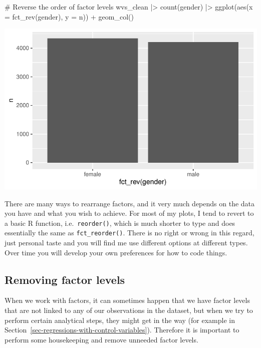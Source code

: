 \documentclass[
  letterpaper,
]{krantz}
\makeatletter
\newenvironment{Shaded}{\begin{snugshade}}{\end{snugshade}}
\newcommand{\AttributeTok}[1]{\textcolor[rgb]{0.40,0.45,0.13}{#1}}
\newcommand{\CommentTok}[1]{\textcolor[rgb]{0.37,0.37,0.37}{#1}}
\newcommand{\FunctionTok}[1]{\textcolor[rgb]{0.28,0.35,0.67}{#1}}
\newcommand{\NormalTok}[1]{\textcolor[rgb]{0.00,0.23,0.31}{#1}}
\newcommand{\SpecialCharTok}[1]{\textcolor[rgb]{0.37,0.37,0.37}{#1}}
\newenvironment{kframe}{%
\medskip{}
\setlength{\fboxsep}{.8em}
 \def\at@end@of@kframe{}%
 \ifinner\ifhmode%
  \def\at@end@of@kframe{\end{minipage}}%
  \begin{minipage}{\columnwidth}%
 \fi\fi%
 \def\FrameCommand##1{\hskip\@totalleftmargin \hskip-\fboxsep
 \colorbox{shadecolor}{##1}\hskip-\fboxsep
     \hskip-\linewidth \hskip-\@totalleftmargin \hskip\columnwidth}%
 \MakeFramed {\advance\hsize-\width
   \@totalleftmargin\z@ \linewidth\hsize
   \@setminipage}}%
 {\par\unskip\endMakeFramed%
 \at@end@of@kframe}
\renewenvironment{Shaded}{\begin{kframe}}{\end{kframe}}
\makeatother
\begin{document}
\begin{Shaded}
\begin{Highlighting}[]
\CommentTok{\# Reverse the order of factor levels}
\NormalTok{wvs\_clean }\SpecialCharTok{|\textgreater{}}
  \FunctionTok{count}\NormalTok{(gender) }\SpecialCharTok{|\textgreater{}}
  \FunctionTok{ggplot}\NormalTok{(}\FunctionTok{aes}\NormalTok{(}\AttributeTok{x =} \FunctionTok{fct\_rev}\NormalTok{(gender),}
             \AttributeTok{y =}\NormalTok{ n)) }\SpecialCharTok{+}
  \FunctionTok{geom\_col}\NormalTok{()}
\end{Highlighting}
\end{Shaded}

\includegraphics{07_data_wrangling_files/figure-pdf/reverse-order-1.pdf}

There are many ways to rearrange factors, and it very much depends on
the data you have and what you wish to achieve. For most of my plots, I
tend to revert to a basic R function, i.e.~\texttt{reorder()}, which is
much shorter to type and does essentially the same as
\texttt{fct\_reorder()}. There is no right or wrong in this regard, just
personal taste and you will find me use different options at different
types. Over time you will develop your own preferences for how to code
things.

\subsection{Removing factor levels}\label{sec-removing-factor-levels}

When we work with factors, it can sometimes happen that we have factor
levels that are not linked to any of our observations in the dataset,
but when we try to perform certain analytical steps, they might get in
the way (for example in
Section~\ref{sec-regressions-with-control-variables}). Therefore it is
important to perform some housekeeping and remove unneeded factor
levels.
\end{document}
